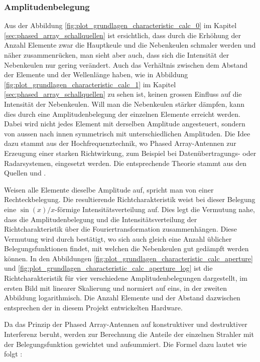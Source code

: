 \subsubsection{Amplitudenbelegung}\label{sec:amplitudenbelegung}
Aus der Abbildung \ref{fig:plot_grundlagen_characteristic_calc_0} im Kapitel \ref{sec:phased_array_schallquellen} ist ersichtlich, dass durch die Erhöhung der Anzahl Elemente zwar die Hauptkeule und die Nebenkeulen schmaler werden und näher zusammenrücken, man sieht aber auch, dass sich die Intensität der Nebenkeulen nur gering verändert. Auch das Verhältnis zwischen dem Abstand der Elemente und der Wellenlänge haben, wie in Abbildung \ref{fig:plot_grundlagen_characteristic_calc_1} im Kapitel \ref{sec:phased_array_schallquellen} zu sehen ist, keinen grossen Einfluss auf die Intensität der Nebenkeulen. Will man die Nebenkeulen stärker dämpfen, kann dies durch eine Amplitudenbelegung der einzelnen Elemente erreicht werden. Dabei wird nicht jedes Element mit derselben Amplitude angesteuert, sondern von aussen nach innen symmetrisch mit unterschiedlichen Amplituden. Die Idee dazu stammt aus der Hochfrequenztechnik, wo Phased Array-Antennen zur Erzeugung einer starken Richtwirkung, zum Beispiel bei Datenübertragungs- oder Radarsystemen, eingesetzt werden. Die entsprechende Theorie stammt aus den Quellen \cite{ELECTROMAGNETICS} und \cite{VISSER}.

Weisen alle Elemente dieselbe Amplitude auf, spricht man von einer Rechteckbelegung. Die resultierende Richtcharakteristik weist bei dieser Belegung eine $\sin(x)/x$-förmige Intensitätsverteilung auf. Dies legt die Vermutung nahe, dass die Amplitudenbelegung und die Intensitätsverteilung der Richtcharakteristik über die Fouriertransformation zusammenhängen. Diese Vermutung wird durch \cite{ELECTROMAGNETICS} bestätigt, wo sich auch gleich eine Anzahl üblicher Belegungsfunktionen findet, mit welchen die Nebenkeulen gut gedämpft werden können. In den Abbildungen \ref{fig:plot_grundlagen_characteristic_calc_aperture} und \ref{fig:plot_grundlagen_characteristic_calc_aperture_log} ist die Richtcharakteristik für vier verschiedene Amplitudenbelegungen dargestellt, im ersten Bild mit linearer Skalierung und normiert auf eins, in der zweiten Abbildung logarithmisch. Die Anzahl Elemente und der Abstand dazwischen entsprechen der in diesem Projekt entwickelten Hardware.

Da das Prinzip der Phased Array-Antennen auf konstruktiver und destruktiver Interferenz beruht, werden zur Berechnung die Anteile der einzelnen Strahler mit der Belegungsfunktion gewichtet und aufsummiert. Die Formel dazu lautet wie folgt \cite{VISSER}:

